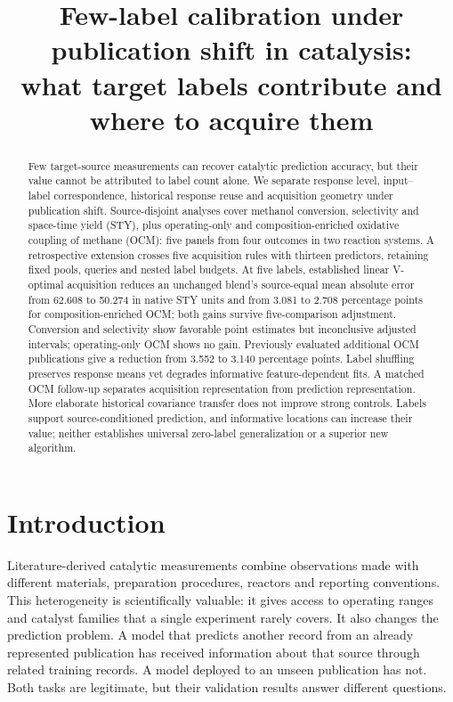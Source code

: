 \documentclass[11pt]{article}
\title{Few-label calibration under publication shift in catalysis:\\what target labels contribute and where to acquire them}
\author{}
\date{}
\begin{document}
\maketitle
\begin{abstract}
Few target-source measurements can recover catalytic prediction accuracy, but their value cannot be attributed to label count alone. We separate response level, input--label correspondence, historical response reuse and acquisition geometry under publication shift. Source-disjoint analyses cover methanol conversion, selectivity and space-time yield (STY), plus operating-only and composition-enriched oxidative coupling of methane (OCM): five panels from four outcomes in two reaction systems. A retrospective extension crosses five acquisition rules with thirteen predictors, retaining fixed pools, queries and nested label budgets. At five labels, established linear V-optimal acquisition reduces an unchanged blend's source-equal mean absolute error from 62.608 to 50.274 in native STY units and from 3.081 to 2.708 percentage points for composition-enriched OCM; both gains survive five-comparison adjustment. Conversion and selectivity show favorable point estimates but inconclusive adjusted intervals; operating-only OCM shows no gain. Previously evaluated additional OCM publications give a reduction from 3.552 to 3.140 percentage points. Label shuffling preserves response means yet degrades informative feature-dependent fits. A matched OCM follow-up separates acquisition representation from prediction representation. More elaborate historical covariance transfer does not improve strong controls. Labels support source-conditioned prediction, and informative locations can increase their value; neither establishes universal zero-label generalization or a superior new algorithm.
\end{abstract}

\section{Introduction}
Literature-derived catalytic measurements combine observations made with different materials, preparation procedures, reactors and reporting conventions. This heterogeneity is scientifically valuable: it gives access to operating ranges and catalyst families that a single experiment rarely covers. It also changes the prediction problem. A model that predicts another record from an already represented publication has received information about that source through related training records. A model deployed to an unseen publication has not. Both tasks are legitimate, but their validation results answer different questions.
\end{document}
